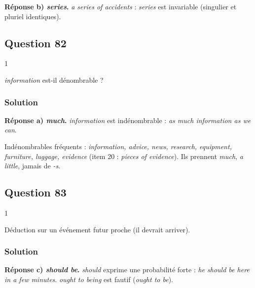 \documentclass[11pt,a4paper]{article}
\begin{document}
\textbf{Réponse b) \emph{series}.} \emph{a series of accidents} : \emph{series} est invariable (singulier et pluriel identiques).

\hypertarget{question-82}{%
\subsection{Question 82}\label{question-82}}

\begin{indication}{1}

\emph{information} est-il dénombrable ?

\end{indication}

\hypertarget{solution-81}{%
\subsubsection{Solution}\label{solution-81}}

\textbf{Réponse a) \emph{much}.} \emph{information} est indénombrable : \emph{as much information as we can}.

\begin{methode}

Indénombrables fréquents : \emph{information, advice, news, research, equipment, furniture, luggage, evidence} (item 20 : \emph{pieces of evidence}). Ils prennent \emph{much}, \emph{a little}, jamais de \emph{-s}.

\end{methode}

\hypertarget{question-83}{%
\subsection{Question 83}\label{question-83}}

\begin{indication}{1}

Déduction sur un événement futur proche (il devrait arriver).

\end{indication}

\hypertarget{solution-82}{%
\subsubsection{Solution}\label{solution-82}}

\textbf{Réponse c) \emph{should be}.} \emph{should} exprime une probabilité forte : \emph{he should be here in a few minutes}. \emph{ought to being} est fautif (\emph{ought to be}).
\end{document}
